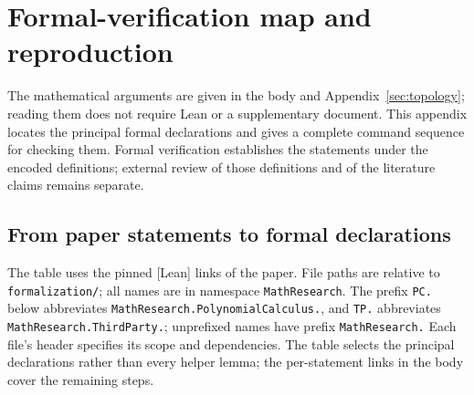 \section{Formal-verification map and reproduction}\label{sec:verification}

The mathematical arguments are given in the body and Appendix~\ref{sec:topology};
reading them does not require Lean or a supplementary document. This appendix
locates the principal formal declarations and gives a complete command sequence
for checking them. Formal verification establishes the statements under the
encoded definitions; external review of those definitions and of the literature
claims remains separate.

\subsection{From paper statements to formal declarations}

The table uses the pinned [Lean] links of the paper. File paths are relative to
\texttt{formalization/}; all names are in namespace \texttt{MathResearch}.
The prefix \texttt{PC.} below abbreviates
\nolinkurl{MathResearch.PolynomialCalculus.}, and \texttt{TP.} abbreviates
\nolinkurl{MathResearch.ThirdParty.}; unprefixed names have prefix
\texttt{MathResearch.} Each file's header specifies its scope and dependencies.
The table selects the principal declarations rather than every helper lemma;
the per-statement links in the body cover the remaining steps.

